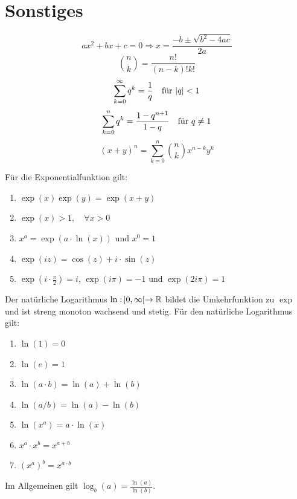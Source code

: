 \section{Sonstiges}



$$ax^2 + bx + c = 0 \Rightarrow x = \frac{-b \pm \sqrt{b^2 - 4ac}}{2a}$$
$$\binom{n}{k} = \frac{n!}{(n-k)!k!}$$
$$\sum\limits_{k=0}^\infty q^k = \frac{1}{q	} \quad \text{für } |q| < 1$$
$$\sum\limits_{k=0}^n q^k = \frac{1 - q^{n+1}}{1 - q} \quad \text{für } q \neq 1$$
$$(x+y)^n = \sum_{k=0}^n \binom{n}{k} x^{n-k} y^k$$


Für die Exponentialfunktion gilt:
\begin{enumerate}[label = (\arabic*)]
	\item $\exp(x) \exp(y) = \exp(x+y)$
	\item $\exp(x) > 1, \quad \forall x > 0$
	\item $x^a = \exp(a \cdot \ln(x))$ und $x^0 = 1$
	\item $\exp(iz) = \cos(z) + i \cdot \sin(z)$
	\item $\exp(i \cdot \frac{\pi}{2}) = i$, $\exp(i \pi) = -1$ und $\exp(2 i \pi) = 1$
\end{enumerate}

Der natürliche Logarithmus $\ln : \, ]0, \infty[ \to \mathbb{R}$ bildet die Umkehrfunktion zu $\exp$ und ist
streng monoton wachsend und stetig. Für den natürliche Logarithmus gilt:

\begin{enumerate}[label = (\arabic*)]
	\item $\ln(1) = 0$
	\item $\ln(e) = 1$
	\item $\ln(a \cdot b) = \ln(a) + \ln(b)$
	\item $\ln(a / b) = \ln(a) - \ln(b)$
	\item $\ln(x^a) = a \cdot \ln(x)$
	\item $x^a \cdot x^b = x^{a + b}$
	\item $(x^a)^b = x^{a \cdot b}$
\end{enumerate}

Im Allgemeinen gilt $\log_b(a) = \frac{\ln(a)}{\ln(b)}$.



